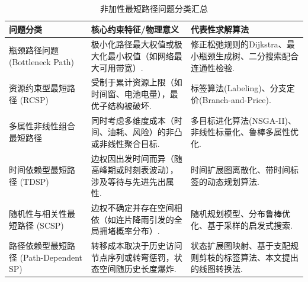 \begin{table}[H]
  \centering
  \caption{非加性最短路径问题分类汇总}
  \label{tab:non_additive_sp_classification}
  \begin{tabularx}{\textwidth}{p{} p{} p{}}
    \toprule
    \textbf{问题分类} & \textbf{核心约束特征/物理意义} & \textbf{代表性求解算法} \\
    \midrule
    瓶颈路径问题 \newline (Bottleneck Path) & 极小化路径最大权值或极大化最小权值（如网络最大可用带宽）. & 修正松弛规则的Dijkstra、最小瓶颈生成树、二分搜索配合连通性检验. \\
    \addlinespace
    资源约束型最短路径 \newline (RCSP) & 受制于累计资源上限（如时间窗、电池电量），最优子结构被破坏. & 标签算法(Labeling)、分支定价(Branch-and-Price). \\
    \addlinespace
    多属性非线性组合 \newline 最短路径 & 同时考虑多维度成本（时间、油耗、风险）的非凸或非线性聚合目标. & 多目标进化算法(NSGA-II)、非线性标量化、鲁棒多属性优化. \\
    \addlinespace
    时间依赖型最短路径 \newline (TDSP) & 边权因出发时间而异（随高峰期或时刻表波动），涉及等待与先进先出属性. & 时间扩展图离散化、带时间标签的动态规划算法. \\
    \addlinespace
    随机性与相关性最短路径 \newline (SCSP) & 边权不确定并存在空间相依（如连片降雨引发的全局拥堵概率分布）. & 随机规划模型、分布鲁棒优化、基于采样的启发式搜索. \\
    \addlinespace
    路径依赖型最短路径 \newline (Path-Dependent SP) & 转移成本取决于历史访问节点序列或转弯惩罚，状态空间随历史长度爆炸. & 状态扩展图映射、基于支配规则剪枝的标签算法、本文提出的线图转换法. \\
    \bottomrule
  \end{tabularx}
\end{table}